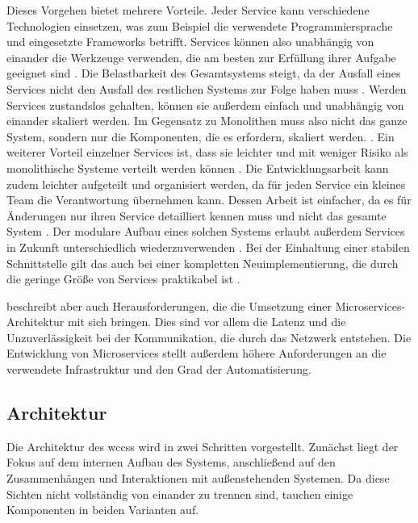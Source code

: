         Dieses Vorgehen bietet mehrere Vorteile.
        Jeder Service kann verschiedene Technologien einsetzen,
        was zum Beispiel die verwendete Programmiersprache und eingesetzte Frameworks betrifft.
        Services können also unabhängig von einander die Werkzeuge verwenden,
        die am besten zur Erfüllung ihrer Aufgabe geeignet sind
        \cite[Kapitel 1.2.1]{newman:microservices}.
        Die Belastbarkeit des Gesamtsystems steigt,
        da der Ausfall eines Services nicht den Ausfall des restlichen Systems
        zur Folge haben muss
        \cite[Kapitel 1.2.2]{newman:microservices}.
        Werden Services zustandslos gehalten,
        können sie außerdem einfach und unabhängig von einander skaliert werden.
        Im Gegensatz zu Monolithen muss also nicht das ganze System,
        sondern nur die Komponenten, die es erfordern, skaliert werden.
        \cite[Kapitel 1.2.3]{newman:microservices}.
        Ein weiterer Vorteil einzelner Services ist,
        dass sie leichter und mit weniger Risiko als monolithische Systeme
        verteilt werden können
        \cite[Kapitel 1.2.4]{newman:microservices}.
        Die Entwicklungsarbeit kann zudem leichter aufgeteilt und organisiert werden,
        da für jeden Service ein kleines Team die Verantwortung übernehmen kann.
        Dessen Arbeit ist einfacher, da es für Änderungen nur ihren Service detailliert kennen muss
        und nicht das gesamte System
        \cite[Kapitel 1.2.5]{newman:microservices}.
        Der modulare Aufbau eines solchen Systems erlaubt außerdem Services
        in Zukunft unterschiedlich wiederzuverwenden
        \cite[Kapitel 1.2.6]{newman:microservices}.
        Bei der Einhaltung einer stabilen Schnittstelle gilt das auch bei einer
        kompletten Neuimplementierung, die durch die geringe Größe von
        Services praktikabel ist
        \cite[Kapitel 1.2.7]{newman:microservices}.       

        \citet[Kapitel 6.1-6.3]{wolff:microservices} beschreibt aber auch
        Herausforderungen, die die Umsetzung einer Microservices-Architektur mit sich bringen.
        Dies sind vor allem die Latenz und die Unzuverlässigkeit bei der Kommunikation,
        die durch das Netzwerk entstehen.
        Die Entwicklung von Microservices stellt außerdem höhere Anforderungen an die
        verwendete Infrastruktur und den Grad der Automatisierung.

    \subsection{Architektur}
        Die Architektur des \glspl{wccs} wird in zwei Schritten vorgestellt.
        Zunächst liegt der Fokus auf dem internen Aufbau des Systems,
        anschließend auf den Zusammenhängen und Interaktionen mit außenstehenden Systemen.
        Da diese Sichten nicht vollständig von einander zu trennen sind,
        tauchen einige Komponenten in beiden Varianten auf.
        

